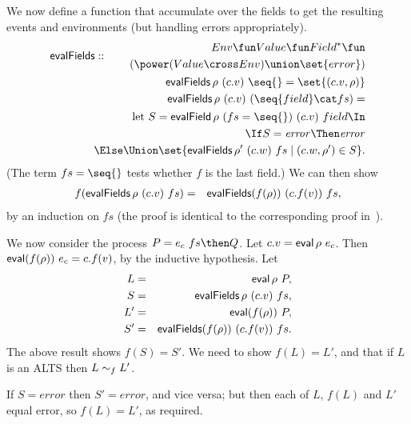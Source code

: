 We now define a function that accumulate over the fields to get the
resulting events and environments (but handling errors appropriately).
\[
\begin{align}
\evalFields :: 
  \begin{align}
  Env \fun  Value \fun Field^* \fun \\
  \qquad (\power (Value \cross Env) \union \set{error})
  \end{align} \\
\evalFields \rho~(c.v)~\seq{} = \set{(c.v,\rho)} \\
\evalFields \rho~(c.v)~(\seq{field} \cat fs)  = \\
\qquad
  \begin{align}
  \Let S = \evalField \rho~(fs=\seq{})~(c.v)~field \In \\
  \If S = \error \Then \error \\
  \Else \Union \set{ \evalFields \rho'~(c.w)~fs \mid  (c.w, \rho') \in S }.
  \end{align}
\end{align}
\]
(The term $fs=\seq{}$ tests whether $f$ is the last field.)
We can then show 
\begin{eqnarray*}%
f(\evalFields \rho~(c.v)~fs) & = & 
  \evalFields (f(\rho))~(c.f(v))~fs ,
\end{eqnarray*}
%
by an induction on $fs$ (the proof is identical to the corresponding proof
in~\cite{symmetry-reduction}).


We now consider the process $P = e_c~ fs \then Q$.  Let $c.v
= \mathop{\sf eval} \rho~e_c$.  Then $\mathop{\sf eval} (f(\rho))~e_c = c.f(v)$, by the inductive
hypothesis.  Let
%
\begin{eqnarray*}
L & = & \mathop{\sf eval} \rho~ P, \\
S & = & \mathop{\sf evalFields} \rho~(c.v)~fs, \\
L' & = &  \mathop{\sf eval} (f(\rho))~ P, \\
S' & = & \mathop{\sf evalFields} (f(\rho))~(c.f(v))~fs.
\end{eqnarray*}%
%
The above result shows $f(S) = S'$.  We need to show $f(L) = L'$, and that if
$L$ is an ALTS then $L \sim_f L'$.


If $S = error$ then $S' = error$, and vice versa; but then each of $L$, $f(L)$
and $L'$ equal error, so $f(L) = L'$, as required. 

